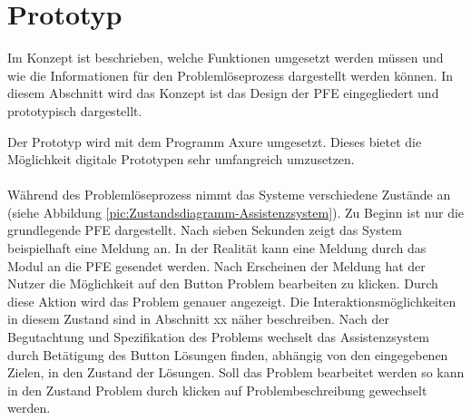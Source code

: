 \chapter{Prototyp}
\label{Prototyp}
Im Konzept ist beschrieben, welche Funktionen umgesetzt werden müssen und wie die Informationen für den Problemlöseprozess dargestellt werden können. In diesem Abschnitt wird das Konzept ist das Design der PFE eingegliedert und prototypisch dargestellt.

Der Prototyp wird mit dem Programm Axure  umgesetzt. Dieses bietet die Möglichkeit digitale Prototypen sehr umfangreich umzusetzen.
\\ \\
Während des Problemlöseprozess nimmt das Systeme verschiedene Zustände an (siehe Abbildung \ref{pic:Zustandsdiagramm-Assistenzsystem}). Zu Beginn ist nur die grundlegende PFE dargestellt. Nach sieben Sekunden zeigt das System beispielhaft eine Meldung an. In der Realität kann eine Meldung durch das Modul an die PFE gesendet werden. Nach Erscheinen der Meldung hat der Nutzer die Möglichkeit auf den Button Problem bearbeiten zu klicken. Durch diese Aktion wird das Problem genauer angezeigt. Die Interaktionsmöglichkeiten in diesem Zustand sind in Abschnitt xx näher beschreiben. Nach der Begutachtung und Spezifikation des Problems wechselt das Assistenzsystem durch Betätigung des Button Lösungen finden, abhängig von den eingegebenen Zielen, in den Zustand der Lösungen. Soll das Problem bearbeitet werden so kann in den Zustand Problem durch klicken auf Problembeschreibung gewechselt werden.

